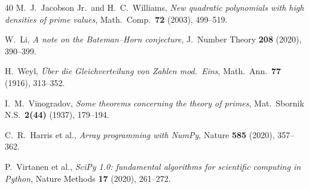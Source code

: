 \documentclass[11pt,a4paper]{article}
\theoremstyle{plain}
\theoremstyle{definition}
\begin{document}
\begin{thebibliography}{40}
 M.~J.~Jacobson Jr.\ and H.~C.~Williams, \textit{New quadratic
polynomials with high densities of prime values}, Math.\ Comp.\ \textbf{72}
(2003), 499--519.

 W.~Li, \textit{A note on the Bateman--Horn conjecture}, J.\
Number Theory \textbf{208} (2020), 390--399.

 H.~Weyl, \textit{\"Uber die Gleichverteilung von Zahlen mod.\
Eins}, Math.\ Ann.\ \textbf{77} (1916), 313--352.

 I.~M.~Vinogradov, \textit{Some theorems concerning
the theory of primes}, Mat.\ Sbornik N.S.\ \textbf{2(44)} (1937), 179--194.

 C.~R.~Harris et al., \textit{Array programming with NumPy},
Nature \textbf{585} (2020), 357--362.

 P.~Virtanen et al., \textit{SciPy 1.0: fundamental algorithms
for scientific computing in Python}, Nature Methods \textbf{17} (2020), 261--272.

\end{thebibliography}
\end{document}
